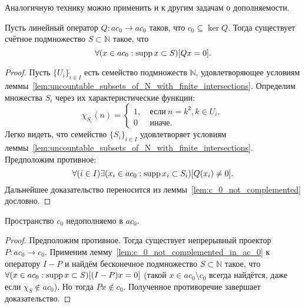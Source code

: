 Аналогичную технику можно применить и к другим задачам о дополняемости.


     

\begin{lemma}
	\label{lem:c_0_not_complemented_in_ac_0}
	Пусть линейный оператор $Q: ac_0 \to ac_0$ таков, что $c_0\subseteq \ker Q$.
	Тогда существует счётное подмножество $S \subset \mathbb{N}$ такое, что
	\begin{equation}
		\forall(x \in ac_0 : \operatorname{supp} x \subset S)[Qx = 0]
		.
	\end{equation}
\end{lemma}

\begin{proof}
	Пусть $\{U_i\}_{i \in I}$ есть семейство подмножеств $\mathbb{N}$,
	удовлетворяющее условиям леммы~\ref{lem:uncountable_subsets_of_N_with_finite_intersections}.
	Определим множества $S_i$ через их характеристические функции:
	\begin{equation}
		\chi_{S_i} (n) = \begin{cases}
			1, & ~\mbox{если}~ n = k^2, k\in U_i,
			\\
			0  & ~\mbox{иначе.}
		\end{cases}
	\end{equation}
	Легко видеть, что семейство $\{S_i\}_{i \in I}$ удовлетворяет условиям леммы~\ref{lem:uncountable_subsets_of_N_with_finite_intersections}.
	Предположим противное:
	\begin{equation}
		\forall(i\in I)\exists(x_i \in ac_0 : \operatorname{supp} x_i \subset S_i)[Q(x_i) \neq 0]
		.
	\end{equation}
	Дальнейшее доказательство переносится из леммы~\ref{lem:c_0_not_complemented} дословно.
\end{proof}

\begin{theorem}
	Пространство $c_0$ недополняемо в $ac_0$.
\end{theorem}


\begin{proof}
	Предположим противное.
	Тогда существует непрерывный проектор $P: ac_0 \to c_0$.
	Применим лемму~\ref{lem:c_0_not_complemented_in_ac_0} к оператору $I-P$
	и найдём бесконечное подмножество $S\subset\mathbb{N}$ такое,
	что $\forall(x\in ac_0 : \operatorname{supp} x \subset S)[(I-P)x = 0]$
	(такой $x \in ac_0 \setminus c_0$ всегда найдётся, даже если $\chi_S \notin ac_0$).
	Но тогда $Px\notin c_0$.
	Полученное противоречие завершает доказательство.
\end{proof}


